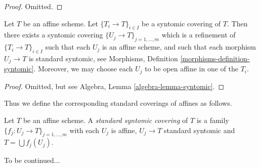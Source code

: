 \begin{proof}
Omitted.
\end{proof}

\begin{lemma}
\label{lemma-syntomic-affine}
Let $T$ be an affine scheme.
Let $\{T_i \to T\}_{i \in I}$ be a syntomic covering of $T$.
Then there exists a syntomic covering
$\{U_j \to T\}_{j = 1, \ldots, m}$ which is a refinement
of $\{T_i \to T\}_{i \in I}$ such that each $U_j$ is an affine
scheme, and such that each morphism $U_j \to T$ is standard
syntomic, see Morphisms, Definition \ref{morphisms-definition-syntomic}.
Moreover, we may choose each $U_j$ to be open affine in one of the $T_i$.
\end{lemma}

\begin{proof}
Omitted, but see Algebra, Lemma \ref{algebra-lemma-syntomic}.
\end{proof}

\noindent
Thus we define the corresponding standard coverings of affines as follows.

\begin{definition}
\label{definition-standard-syntomic}
Let $T$ be an affine scheme. A {\it standard syntomic covering} of $T$ is
a family $\{f_j : U_j \to T\}_{j = 1, \ldots, m}$ with each $U_j$ is
affine, $U_j \to T$ standard syntomic and $T = \bigcup f_j(U_j)$.
\end{definition}

\noindent
To be continued...





































































